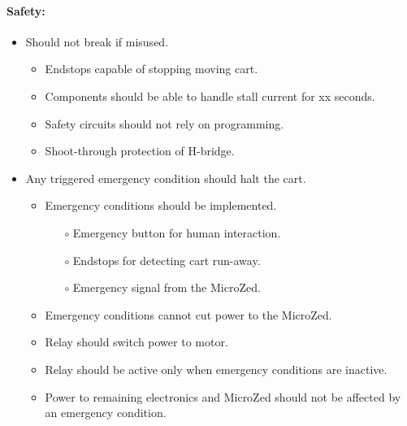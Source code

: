 	
\paragraph{Safety:}
\begin{itemize}
	\item Should not break if misused.
	\begin{itemize}
		\item Endstops capable of stopping moving cart.
		\item Components should be able to handle stall current for xx seconds.
		\item Safety circuits should not rely on programming.
		\item Shoot-through protection of H-bridge.
	\end{itemize}

	\item Any triggered emergency condition should halt the cart.
		\begin{itemize}
			\item Emergency conditions should be implemented.
			\begin{itemize}
				\item[$\circ$] Emergency button for human interaction.
				\item[$\circ$] Endstops for detecting cart run-away.
				\item[$\circ$] Emergency signal from the MicroZed.
			\end{itemize}
			\item Emergency conditions cannot cut power to the MicroZed.
			\item Relay should switch power to motor.
			\item Relay should be active only when emergency conditions are inactive.
			\item Power to remaining electronics and MicroZed should not be affected by an emergency condition.
		\end{itemize}
\end{itemize}
